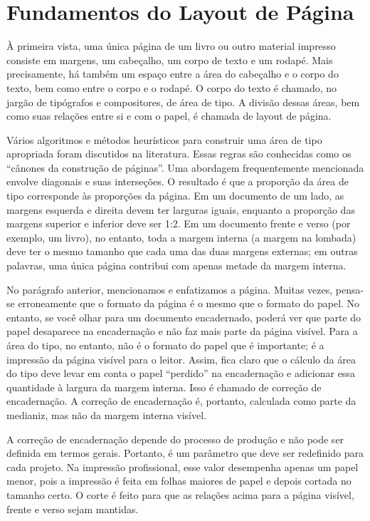 \chapter{Fundamentos do Layout de Página}
À primeira vista, uma única página de um livro ou outro material impresso consiste em margens, um cabeçalho, um corpo de texto e um rodapé. Mais precisamente, há também um espaço entre a área do cabeçalho e o corpo do texto, bem como entre o corpo e o rodapé. O corpo do texto é chamado, no jargão de tipógrafos e compositores, de área de tipo. A divisão dessas áreas, bem como suas relações entre si e com o papel, é chamada de layout de página.

Vários algoritmos e métodos heurísticos para construir uma área de tipo apropriada foram discutidos na literatura. Essas regras são conhecidas como os “cânones da construção de páginas”. Uma abordagem frequentemente mencionada envolve diagonais e suas interseções. O resultado é que a proporção da área de tipo corresponde às proporções da página. Em um documento de um lado, as margens esquerda e direita devem ter larguras iguais, enquanto a proporção das margens superior e inferior deve ser 1:2. Em um documento frente e verso (por exemplo, um livro), no entanto, toda a margem interna (a margem na lombada) deve ter o mesmo tamanho que cada uma das duas margens externas; em outras palavras, uma única página contribui com apenas metade da margem interna.

No parágrafo anterior, mencionamos e enfatizamos a página. Muitas vezes, pensa-se erroneamente que o formato da página é o mesmo que o formato do papel. No entanto, se você olhar para um documento encadernado, poderá ver que parte do papel desaparece na encadernação e não faz mais parte da página visível. Para a área do tipo, no entanto, não é o formato do papel que é importante; é a impressão da página visível para o leitor. Assim, fica claro que o cálculo da área do tipo deve levar em conta o papel “perdido” na encadernação e adicionar essa quantidade à largura da margem interna. Isso é chamado de correção de encadernação. A correção de encadernação é, portanto, calculada como parte da medianiz, mas não da margem interna visível.

A correção de encadernação depende do processo de produção e não pode ser definida em termos gerais. Portanto, é um parâmetro que deve ser redefinido para cada projeto. Na impressão profissional, esse valor desempenha apenas um papel menor, pois a impressão é feita em folhas maiores de papel e depois cortada no tamanho certo. O corte é feito para que as relações acima para a página visível, frente e verso sejam mantidas.

